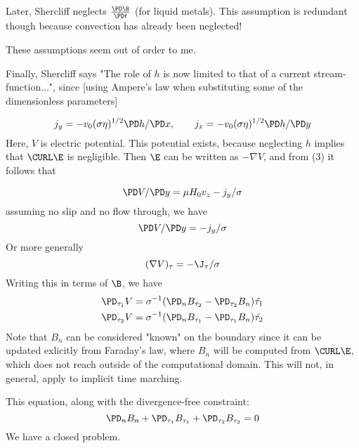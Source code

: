 \documentclass[11pt]{article}
\begin{document}
Later, Shercliff neglects $\frac{\PD \B}{\PD t}$ (for liquid  metals). This assumption is redundant though because convection has already been neglected!

These assumptions seem out of  order to me.


Finally, Shercliff says "The role of $h$ is now limited to that of a current stream-function...", since [using Ampere's law when substituting some of the dimensionless parameters]

\begin{equation}
  j_y = -v_0 (\sigma \eta)^{1/2} \PD h/\PD x
  , \qquad
  j_x = -v_0 (\sigma \eta)^{1/2} \PD h/\PD y
\end{equation}
Here, $V$ is electric potential. This potential exists, because neglecting $\dot{h}$ implies that $\CURL \E$ is negligible. Then $\E $ can be written as $ -\nabla V$, and from (3) it follows that

\begin{equation}
  \PD V / \PD y = \mu H_0 v_z - j_y/\sigma
\end{equation}
assuming no slip and no flow through, we have
\begin{equation}
  \PD V / \PD y = - j_y/\sigma
\end{equation}
Or more generally
\begin{equation}
  (\nabla V)_{\tau} = - \J_{\tau}/\sigma
\end{equation}
Writing this in terms of $\B$, we have
\begin{equation}
\begin{aligned}
  \PD_{\tau_1} V = \sigma^{-1}(\PD_n B_{\tau_2} - \PD_{\tau_2} B_n) \hat{\tau_1} \\
  \PD_{\tau_2} V = \sigma^{-1} (\PD_n B_{\tau_1} - \PD_{\tau_1} B_n) \hat{\tau_2} \\
\end{aligned}
\end{equation}
Note that $B_n$ can be considered "known" on the boundary since it can be updated exlicitly from Faraday's law, where $B_n$ will be computed from $\CURL \E$, which does not reach outside of the computational domain. This will not, in general, apply to implicit time marching.

This equation, along with the divergence-free constraint:
\begin{equation}
  \PD_n B_n + \PD_{\tau_1} B_{\tau_1} + \PD_{\tau_2} B_{\tau_2} = 0
\end{equation}
We have a closed problem.
\end{document}
